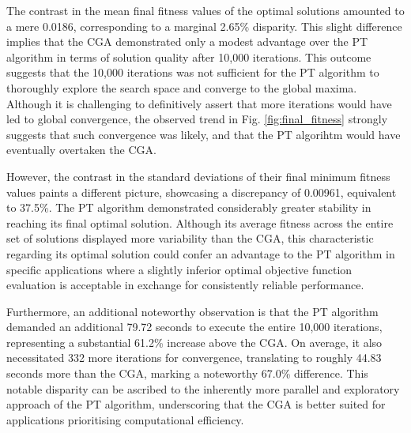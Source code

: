 \documentclass[10pt]{article}
\begin{document}
\begin{multicols}{2}
The contrast in the mean final fitness values of the optimal solutions amounted to a mere 0.0186, corresponding to a marginal 2.65\% disparity. This slight difference implies that the CGA demonstrated only a modest advantage over the PT algorithm in terms of solution quality after 10,000 iterations. This outcome suggests that the 10,000 iterations was not sufficient for the PT algorithm to thoroughly explore the search space and converge to the global maxima. Although it is challenging to definitively assert that more iterations would have led to global convergence, the observed trend in Fig. \ref{fig:final_fitness} strongly suggests that such convergence was likely, and that the PT algorihtm would have eventually overtaken the CGA.

However, the contrast in the standard deviations of their final minimum fitness values paints a different picture, showcasing a discrepancy of 0.00961, equivalent to 37.5\%. The PT algorithm demonstrated considerably greater stability in reaching its final optimal solution. Although its average fitness across the entire set of solutions displayed more variability than the CGA, this characteristic regarding its optimal solution could confer an advantage to the PT algorithm in specific applications where a slightly inferior optimal objective function evaluation is acceptable in exchange for consistently reliable performance.

Furthermore, an additional noteworthy observation is that the PT algorithm demanded an additional 79.72 seconds to execute the entire 10,000 iterations, representing a substantial 61.2\% increase above the CGA. On average, it also necessitated 332 more iterations for convergence, translating to roughly 44.83 seconds more than the CGA, marking a noteworthy 67.0\% difference. This notable disparity can be ascribed to the inherently more parallel and exploratory approach of the PT algorithm, underscoring that the CGA is better suited for applications prioritising computational efficiency.


\end{multicols}
\end{document}
